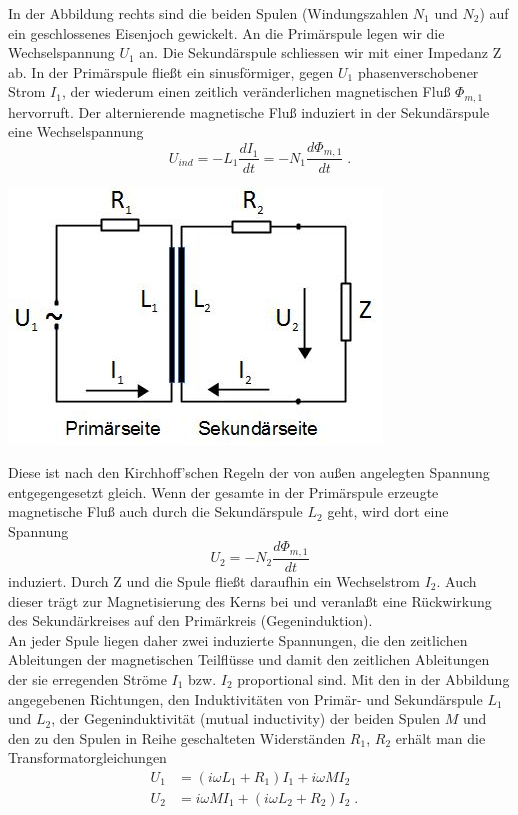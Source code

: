 \noindent
\begin{minipage}{0.6\textwidth}
In der Abbildung rechts sind die beiden Spulen (Windungszahlen $N_1$ und $N_2$) auf ein geschlossenes Eisenjoch gewickelt. An die Primärspule legen wir die Wechselspannung $U_1$ an. Die Sekundärspule schliessen wir mit einer Impedanz Z ab. In der Primärspule fließt ein sinusförmiger, gegen $U_1$ phasenverschobener Strom $I_1$, der wiederum einen zeitlich veränderlichen magnetischen Fluß $\Phi_{m,1}$ hervorruft. Der alternierende magnetische Fluß induziert in der Sekundärspule eine Wechselspannung
\begin{equation}
U_{ind} = -L_1\frac{dI_1}{dt} = -N_1\frac{d\Phi_{m,1}}{dt}\; .
\end{equation}
\end{minipage}
%
\begin{minipage}{0.4\textwidth}
	\includegraphics[width=\textwidth]{Versuch_15-16/Abbildungen/Trafo1.jpg}
	\label{fig:Trafo1}
\end{minipage}
%

\noindent
Diese ist nach den Kirchhoff'schen Regeln der von außen angelegten Spannung entgegengesetzt gleich. Wenn der gesamte in der Primärspule erzeugte magnetische Fluß auch durch die Sekundärspule $L_2$ geht, wird dort eine Spannung
\begin{equation}
U_2 = -N_2\frac{d\Phi_{m,1}}{dt}
\end{equation}
induziert. Durch Z und die Spule fließt daraufhin ein Wechselstrom $I_2$. Auch dieser trägt zur Magnetisierung des Kerns bei und veranlaßt eine Rückwirkung des Sekundärkreises auf den Primärkreis (Gegeninduktion).\\
An jeder Spule liegen daher zwei induzierte Spannungen, die den zeitlichen Ableitungen der magnetischen Teilflüsse und damit den zeitlichen Ableitungen der sie erregenden Ströme $I_1$ bzw. $I_2$ proportional sind. Mit den in der Abbildung angegebenen Richtungen, den Induktivitäten von Primär- und Sekundärspule $L_1$und $L_2$, der Gegeninduktivität (mutual inductivity) der beiden Spulen $M$ und den zu den Spulen in Reihe geschalteten Widerständen $R_1$, $R_2$ erhält man die Transformatorgleichungen
\begin{align*}
U_1 & = (i\omega L_1 + R_1) I_1 + i\omega M I_2 &\\
U_2 & = i\omega M I_1 + (i\omega L_2 + R_2) I_2 \; .
\end{align*}

